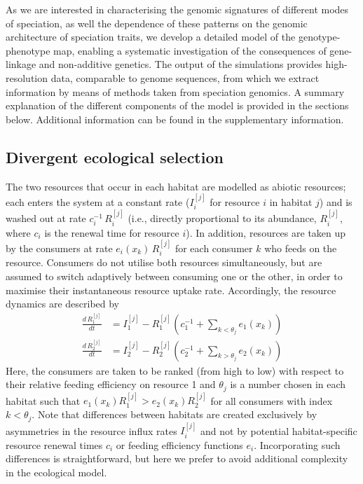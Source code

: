 \documentclass[11pt]{article}
\newcommand{\scr}[3]{\ensuremath{{#1}_{#2}^{[#3]}}}
\begin{document}
As we are interested in characterising the genomic signatures of different modes of speciation, as well the dependence of these patterns on the genomic architecture of speciation traits, we develop a detailed model of the genotype-phenotype map, enabling a systematic investigation of the consequences of gene-linkage and non-additive genetics. The output of the simulations provides high-resolution data, comparable to genome sequences, from which we extract information by means of methods taken from speciation genomics. A summary explanation of the different components of the model is provided in the sections below. Additional information can be found in the supplementary information.

\subsection*{Divergent ecological selection}
The two resources that occur in each habitat are modelled as abiotic resources; each enters the system at a constant rate (\scr{I}{i}{j} for resource $i$ in habitat $j$) and is washed out at rate $c_i^{-1}\,\scr{R}{i}{j}$ (i.e., directly proportional to its abundance, \scr{R}{i}{j}, where $c_i$ is the renewal time for resource $i$). In addition, resources are taken up by the consumers at rate $e_i(x_k)\,\scr{R}{i}{j}$ for each consumer $k$ who feeds on the resource. Consumers do not utilise both resources simultaneously, but are assumed to switch adaptively between consuming one or the other, in order to maximise their instantaneous resource uptake rate. Accordingly, the resource dynamics are described by
\begin{align}
\frac{d\,\scr{R}{1}{j}}{dt} &= \scr{I}{1}{j} - \scr{R}{1}{j}\left(c_1^{-1} +  \sum_{k < \theta_j} e_1(x_k)\right)\\
\frac{d\,\scr{R}{2}{j}}{dt} &= \scr{I}{2}{j} - \scr{R}{2}{j}\left(c_2^{-1} +  \sum_{k > \theta_j} e_2(x_k)\right)
\end{align}
Here, the consumers are taken to be ranked (from high to low) with respect to their relative feeding efficiency on resource 1 and $\theta_j$ is a number chosen in each habitat such that $e_1(x_k) \scr{R}{1}{j} > e_2(x_k) \scr{R}{2}{j}$ for all consumers with index $k <  \theta_j$. Note that differences between habitats are created exclusively by asymmetries in the resource influx rates \scr{I}{i}{j} and not by potential habitat-specific resource renewal times $c_i$ or feeding efficiency functions $e_i$. Incorporating such differences is straightforward, but here we prefer to avoid additional complexity in the ecological model. 
\end{document}
